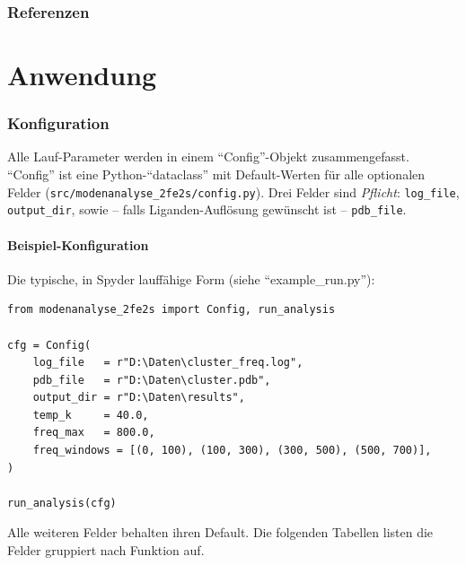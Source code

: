 \documentclass[11pt,a4paper,twoside]{article}
\theoremstyle{remark}
\begin{document}

\clearpage
\section*{Referenzen}

\part{Anwendung}

\section{Konfiguration}
\label{sec:konfig}

Alle Lauf-Parameter werden in einem ``Config''-Objekt zusammengefasst.
``Config'' ist eine Python-``dataclass'' mit Default-Werten f\"ur alle
optionalen Felder (\texttt{src/modenanalyse\_2fe2s/config.py}). Drei
Felder sind \emph{Pflicht}: \texttt{log\_file}, \texttt{output\_dir},
sowie -- falls Liganden-Aufl\"osung gew\"unscht ist --
\texttt{pdb\_file}.

\subsection{Beispiel-Konfiguration}

Die typische, in Spyder lauff\"ahige Form (siehe ``example\_run.py''):

\begin{lstlisting}[style=python]
from modenanalyse_2fe2s import Config, run_analysis

cfg = Config(
    log_file   = r"D:\Daten\cluster_freq.log",
    pdb_file   = r"D:\Daten\cluster.pdb",
    output_dir = r"D:\Daten\results",
    temp_k     = 40.0,
    freq_max   = 800.0,
    freq_windows = [(0, 100), (100, 300), (300, 500), (500, 700)],
)

run_analysis(cfg)
\end{lstlisting}

Alle weiteren Felder behalten ihren Default. Die folgenden Tabellen
listen die Felder gruppiert nach Funktion auf.
\end{document}
